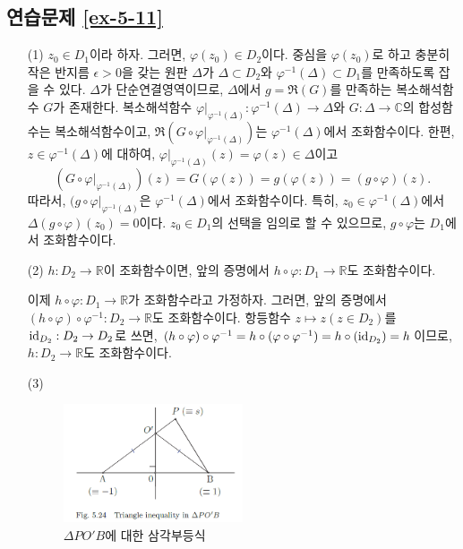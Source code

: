 \subsection*{연습문제 \ref{ex-5-11}}
\begin{itemize}
\item[(1)] 
$z_0\in D_1$이라 하자. 그러면, $\varphi(z_0)\in D_2$이다.
중심을 $\varphi(z_0)$로 하고 충분히 작은 반지름 $\epsilon>0$을 갖는
원판 $\Delta$가 $\Delta \subset D_2$와 $\varphi^{-1}(\Delta) \subset D_1$를
만족하도록 잡을 수 있다.
$\Delta$가 단순연결영역이므로, $\Delta$에서 $g=\Re(G)$를 만족하는
복소해석함수 $G$가 존재한다.
복소해석함수 $\varphi|_{\varphi^{-1}(\Delta)}: \varphi^{-1}(\Delta)\to \Delta$와
$G: \Delta \to \mathbb C$의 합성함수는 복소해석함수이고,
$\Re(G\circ\varphi|_{\varphi^{-1}(\Delta)})$는 $\varphi^{-1}(\Delta)$에서
조화함수이다. 
한편, $z\in \varphi^{-1}(\Delta)$에 대하여, 
$\varphi|_{\varphi^{-1}(\Delta)}(z)  = \varphi(z)\in \Delta$이고
\[
(G\circ \varphi|_{\varphi^{-1}(\Delta)})(z)
= G(\varphi(z)) = g(\varphi(z)) = (g\circ \varphi)(z).
\]
따라서, $(g\circ \varphi|_{\varphi^{-1}(\Delta)}$은 
$\varphi^{-1}(\Delta)$에서 조화함수이다.
특히, $z_0\in \varphi^{-1}(\Delta)$에서 
$\Delta(g\circ \varphi)(z_0)=0$이다.
$z_0\in D_1$의 선택을 임의로 할 수 있으므로, $g\circ \varphi$는 $D_1$에서 조화함수이다.

\item[(2)] $h:D_2\to\mathbb R$이 조화함수이면, 앞의 증명에서
$h\circ \varphi : D_1 \to \mathbb R$도 조화함수이다.

이제 $h\circ \varphi : D_1 \to \mathbb R$가 조화함수라고 가정하자.
그러면, 앞의 증명에서 $(h\circ\varphi)\circ\varphi^{-1}:D_2 \to \mathbb R$도 조화함수이다.
항등함수 $z\mapsto z (z\in D_2)$를 ${\rm id}_{D_2}: D_2 \to D_2$로 쓰면,
$(h\circ \varphi)\circ \varphi^{-1} = h\circ(\varphi \circ \varphi^{-1})
= h\circ ({\rm id}_{D_2}) =h$이므로,
$h:D_2\to\mathbb R$도 조화함수이다. 

\item[(3)] \

\begin{figure}[h!]
\begin{center}
\includegraphics[width=0.5\textwidth]{./Solution/figs/fig-5-24}
\end{center}
\caption{$\Delta PO'B$에 대한 삼각부등식
}
\label{fig-5-24}
\end{figure}


\end{itemize}
